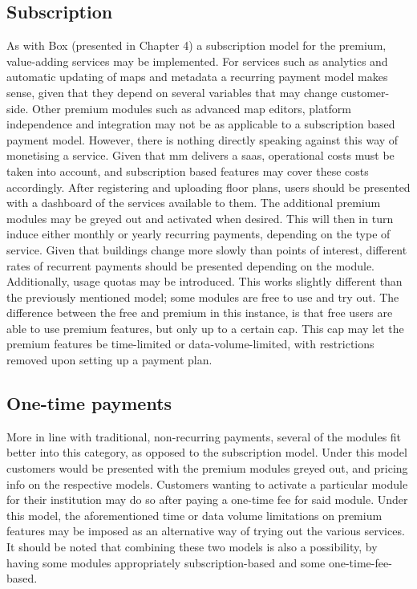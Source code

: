 \subsection{Subscription}
As with Box (presented in Chapter 4) a subscription model for the premium, value-adding services may be implemented. For services such as analytics and automatic updating of maps and metadata a recurring payment model makes sense, given that they depend on several variables that may change customer-side. Other premium modules such as advanced map editors, platform independence and integration may not be as applicable to a subscription based payment model. However, there is nothing directly speaking against this way of monetising a service. Given that \gls{mm} delivers a \gls{saas}, operational costs must be taken into account, and subscription based features may cover these costs accordingly. After registering and uploading floor plans, users should be presented with a dashboard of the services available to them. The additional premium modules may be greyed out and activated when desired. This will then in turn induce either monthly or yearly recurring payments, depending on the type of service. Given that buildings change more slowly than points of interest, different rates of recurrent payments should be presented depending on the module. Additionally, usage quotas may be introduced. This works slightly different than the previously mentioned model; some modules are free to use and try out. The difference between the free and premium in this instance, is that free users are able to use premium features, but only up to a certain cap. This cap may let the premium features be time-limited or data-volume-limited, with restrictions removed upon setting up a payment plan.  

\subsection{One-time payments}
More in line with traditional, non-recurring payments, several of the modules fit better into this category, as opposed to the subscription model. Under this model customers would be presented with the premium modules greyed out, and pricing info on the respective models. Customers wanting to activate a particular module for their institution may do so after paying a one-time fee for said module. Under this model, the aforementioned time or data volume limitations on premium features may be imposed as an alternative way of trying out the various services. It should be noted that combining these two models is also a possibility, by having some modules appropriately subscription-based and some one-time-fee-based.


